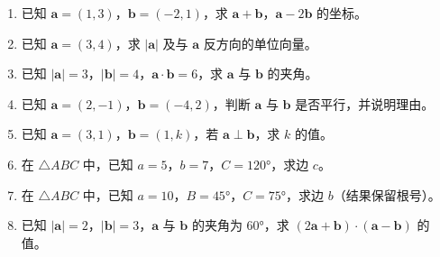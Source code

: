 \documentclass[12pt, a4paper]{ctexart}
\begin{document}
\begin{enumerate}[leftmargin=2em]
  \item 已知 $\boldsymbol{a}=(1,3)$，$\boldsymbol{b}=(-2,1)$，求 $\boldsymbol{a}+\boldsymbol{b}$，$\boldsymbol{a}-2\boldsymbol{b}$ 的坐标。

  \item 已知 $\boldsymbol{a}=(3,4)$，求 $|\boldsymbol{a}|$ 及与 $\boldsymbol{a}$ 反方向的单位向量。

  \item 已知 $|\boldsymbol{a}|=3$，$|\boldsymbol{b}|=4$，$\boldsymbol{a}\cdot\boldsymbol{b}=6$，求 $\boldsymbol{a}$ 与 $\boldsymbol{b}$ 的夹角。

  \item 已知 $\boldsymbol{a}=(2,-1)$，$\boldsymbol{b}=(-4,2)$，判断 $\boldsymbol{a}$ 与 $\boldsymbol{b}$ 是否平行，并说明理由。

  \item 已知 $\boldsymbol{a}=(3,1)$，$\boldsymbol{b}=(1,k)$，若 $\boldsymbol{a}\perp\boldsymbol{b}$，求 $k$ 的值。

  \item 在 $\triangle ABC$ 中，已知 $a=5$，$b=7$，$C=120°$，求边 $c$。

  \item 在 $\triangle ABC$ 中，已知 $a=10$，$B=45°$，$C=75°$，求边 $b$（结果保留根号）。

  \item 已知 $|\boldsymbol{a}|=2$，$|\boldsymbol{b}|=3$，$\boldsymbol{a}$ 与 $\boldsymbol{b}$ 的夹角为 $60°$，求 $(2\boldsymbol{a}+\boldsymbol{b})\cdot(\boldsymbol{a}-\boldsymbol{b})$ 的值。
\end{enumerate}
\end{document}

